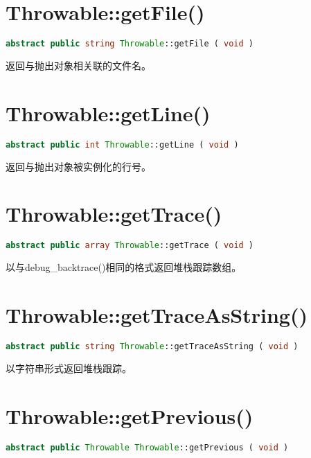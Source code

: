 \section{Throwable::getFile()}

\begin{lstlisting}[language=PHP]
abstract public string Throwable::getFile ( void )
\end{lstlisting}


返回与抛出对象相关联的文件名。

\section{Throwable::getLine()}

\begin{lstlisting}[language=PHP]
abstract public int Throwable::getLine ( void )
\end{lstlisting}

返回与抛出对象被实例化的行号。

\section{Throwable::getTrace()}

\begin{lstlisting}[language=PHP]
abstract public array Throwable::getTrace ( void )
\end{lstlisting}

以与debug\_backtrace()相同的格式返回堆栈跟踪数组。


\section{Throwable::getTraceAsString()}

\begin{lstlisting}[language=PHP]
abstract public string Throwable::getTraceAsString ( void )
\end{lstlisting}

以字符串形式返回堆栈跟踪。


\section{Throwable::getPrevious()}

\begin{lstlisting}[language=PHP]
abstract public Throwable Throwable::getPrevious ( void )
\end{lstlisting}

